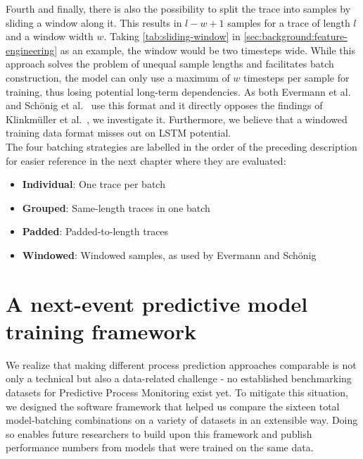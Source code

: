Fourth and finally, there is also the possibility to split the trace into samples by sliding a window along it. This results in $l-w+1$ samples for a trace of length $l$ and a window width $w$. Taking \autoref{tab:sliding-window} in \autoref{sec:background:feature-engineering} as an example, the window would be two timesteps wide. While this approach solves the problem of unequal sample lengths and facilitates batch construction, the model can only use a maximum of $w$ timesteps per sample for training, thus losing potential long-term dependencies. As both Evermann et al.~\cite{evermann2016} and Schönig et al.~\cite{schoenig2018} use this format and it directly opposes the findings of Klinkmüller et al.~\cite{klinkmuller2018reliablemonitoring}, we investigate it. Furthermore, we believe that a windowed training data format misses out on LSTM potential.\\

The four batching strategies are labelled in the order of the preceding description for easier reference in the next chapter where they are evaluated:
\begin{itemize}
    \item\textbf{Individual}: One trace per batch
    \item\textbf{Grouped}: Same-length traces in one batch
    \item\textbf{Padded}: Padded-to-length traces
    \item\textbf{Windowed}: Windowed samples, as used by Evermann and Schönig
\end{itemize}

\section{A next-event predictive model training framework}
\label{sec:contrib:training-framework}
We realize that making different process prediction approaches comparable is not only a technical but also a data-related challenge - no established benchmarking datasets for Predictive Process Monitoring exist yet.
To mitigate this situation, we designed the software framework that helped us compare the sixteen total model-batching combinations on a variety of datasets in an extensible way. Doing so enables future researchers to build upon this framework and publish performance numbers from models that were trained on the same data.\\

